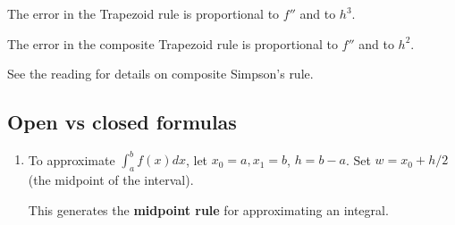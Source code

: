 \documentclass[12pt,letterpaper,noanswers]{exam}
\begin{document}
The error in the Trapezoid rule is proportional to $f''$ and to $h^3$.

The error in the composite Trapezoid rule is proportional to $f''$ and to $h^2$.

See the reading for details on composite Simpson's rule.




\subsection*{Open vs closed formulas}

\begin{enumerate}[resume=classQ]
    \item To approximate $\displaystyle\int_a^b f(x)dx$, let $x_0 = a, x_1 = b$, $h = b-a$.  Set $w = x_0 + h/2$ (the midpoint of the interval).
This generates the \textbf{midpoint rule} for approximating an integral.
\end{enumerate}
\end{document}

